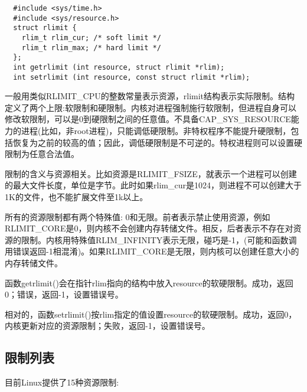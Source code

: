 \begin{lstlisting}
  #include <sys/time.h>
  #include <sys/resource.h>
  struct rlimit {
    rlim_t rlim_cur; /* soft limit */
    rlim_t rlim_max; /* hard limit */
  };
  int getrlimit (int resource, struct rlimit *rlim);
  int setrlimit (int resource, const struct rlimit *rlim);
\end{lstlisting}

  一般用类似RLIMIT\_CPU的整数常量表示资源，rlimit结构表示实际限制。结构定义了两个上限:软限制和硬限制。内核对进程强制施行软限制，但进程自身可以修改软限制，可以是0到硬限制之间的任意值。不具备CAP\_SYS\_RESOURCE能力的进程(比如，非root进程)，只能调低硬限制。非特权程序不能提升硬限制，包括恢复为之前的较高的值；因此，调低硬限制是不可逆的。特权进程则可以设置硬限制为任意合法值。

  限制的含义与资源相关。比如资源是RLIMIT\_FSIZE，就表示一个进程可以创建的最大文件长度，单位是字节。此时如果rlim\_cur是1024，则进程不可以创建大于1K的文件，也不能扩展文件至1k以上。

  所有的资源限制都有两个特殊值: 0和无限。前者表示禁止使用资源，例如RLIMIT\_CORE是0，则内核不会创建内存转储文件。相反，后者表示不存在对资源的限制。内核用特殊值RLIM\_INFINITY表示无限，碰巧是-1，(可能和函数调用错误返回-1相混淆)。如果RLIMIT\_CORE是无限，则内核可以创建任意大小的内存转储文件。

  函数getrlimit()会在指针rlim指向的结构中放入resource的软硬限制。成功，返回0；错误，返回-1，设置错误号。

  相对的，函数setrlimit()按rlim指定的值设置resource的软硬限制。成功，返回0，内核更新对应的资源限制；失败，返回-1，设置错误号。

\subsection{限制列表}

  目前Linux提供了15种资源限制:


